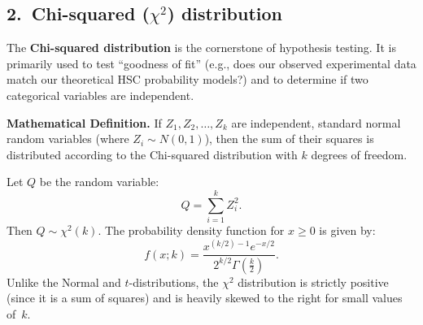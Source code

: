 \subsection*{2.\ Chi-squared ($\chi^2$) distribution}

The \textbf{Chi-squared distribution} is the cornerstone of hypothesis testing. It is primarily used to test ``goodness of fit'' (e.g., does our observed experimental data match our theoretical HSC probability models?) and to determine if two categorical variables are independent.

\textbf{Mathematical Definition.}
If $Z_1, Z_2, \dots, Z_k$ are independent, standard normal random variables (where $Z_i \sim N(0,1)$), then the sum of their squares is distributed according to the Chi-squared distribution with $k$ degrees of freedom.

Let $Q$ be the random variable:
\[
    Q = \sum_{i=1}^{k} Z_i^2.
\]
Then $Q \sim \chi^2(k)$. The probability density function for $x \ge 0$ is given by:
\[
    f(x; k) = \frac{x^{(k/2)-1} e^{-x/2}}{2^{k/2} \Gamma\left(\frac{k}{2}\right)}.
\]
Unlike the Normal and $t$-distributions, the $\chi^2$ distribution is strictly positive (since it is a sum of squares) and is heavily skewed to the right for small values of~$k$.
